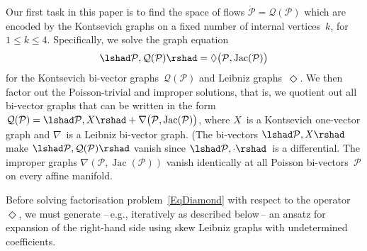 \documentclass[a4paper]{jpconf}%
\theoremstyle{definition}
\theoremstyle{remark}
\newcommand{\cP}{\mathcal{P}}\newcommand{\cR}{\mathcal{R}}
\newcommand{\cQ}{\mathcal{Q}}
\DeclareMathOperator{\Jac}{Jac}
\begin{document}
Our first task in this paper is %
to find the space of flows $\dot{\cP} = \cQ (\cP)$ which are encoded by the Kontsevich graphs on a fixed number of internal vertices~$k$, for $1\leqslant k\leqslant 4$. Specifically, we solve the graph equation
\begin{equation}\label{EqDiamond}
\lshad\cP,\cQ (\cP)\rshad = \Diamond\bigl(\cP,\Jac(\cP)\bigr)
\end{equation}
for the Kontsevich bi-vector graphs~$\cQ(\cP)$ and %
Leibniz graphs~$\Diamond$. %
We then %
factor out the Poisson\/-\/trivial and improper solutions, that is, we quotient out all bi\/-\/vector graphs that can be written in the form 
$%
\cQ(\cP) = \lshad\cP ,X\rshad + \nabla\bigl(\cP,\Jac(\cP)\bigr)$,
where $X$~is a Kontsevich one\/-\/vector graph and $\nabla$~is a Leibniz bi\/-\/vector graph. (The bi\/-\/vectors $\lshad\cP, X\rshad$ make $\lshad\cP , \cQ(\cP)\rshad$ vanish since $\lshad\cP,\cdot\rshad$~is a differential. %
The improper graphs $\nabla (\cP,\Jac (\cP))$ %
vanish identically at all Poisson bi-vectors~$\cP$ on every affine manifold.

Before solving %
factorisation problem~\eqref{EqDiamond} %
with respect to the operator~$\Diamond$,
we must generate --\,e.g., iteratively as described below\,--
an ansatz for expansion of the right\/-\/hand side %
using skew Leibniz graphs with un\-de\-ter\-mi\-ned coefficients. 

\end{document}
